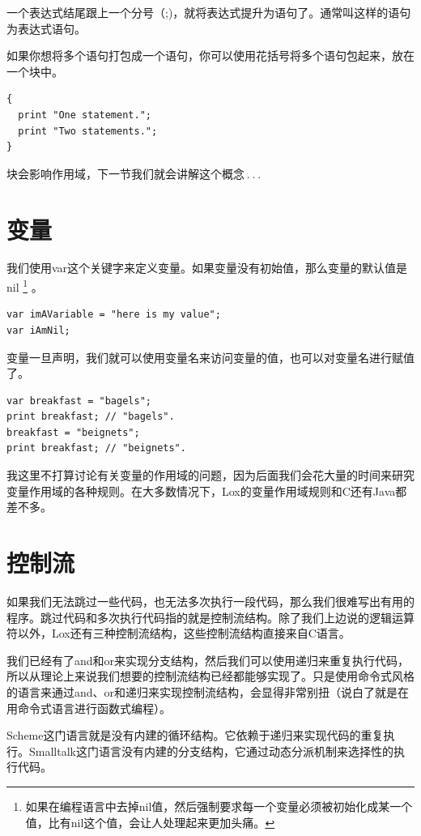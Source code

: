 \documentclass[cn,10pt,math=newtx,citestyle=gb7714-2015,bibstyle=gb7714-2015]{elegantbook}
\begin{document}
一个表达式结尾跟上一个分号（;)，就将表达式提升为语句了。通常叫这样的语句为表达式语句。

如果你想将多个语句打包成一个语句，你可以使用花括号将多个语句包起来，放在一个块中。

\begin{verbatim}
{
  print "One statement.";
  print "Two statements.";
}
\end{verbatim}

块会影响作用域，下一节我们就会讲解这个概念 . . .

\section{变量}

我们使用var这个关键字来定义变量。如果变量没有初始值，那么变量的默认值是nil \footnote{如果在编程语言中去掉nil值，然后强制要求每一个变量必须被初始化成某一个值，比有nil这个值，会让人处理起来更加头痛。} 。

\begin{verbatim}
var imAVariable = "here is my value";
var iAmNil;
\end{verbatim}

变量一旦声明，我们就可以使用变量名来访问变量的值，也可以对变量名进行赋值了。

\begin{verbatim}
var breakfast = "bagels";
print breakfast; // "bagels".
breakfast = "beignets";
print breakfast; // "beignets".
\end{verbatim}

我这里不打算讨论有关变量的作用域的问题，因为后面我们会花大量的时间来研究变量作用域的各种规则。在大多数情况下，Lox的变量作用域规则和C还有Java都差不多。

\section{控制流}

如果我们无法跳过一些代码，也无法多次执行一段代码，那么我们很难写出有用的程序。跳过代码和多次执行代码指的就是控制流结构。除了我们上边说的逻辑运算符以外，Lox还有三种控制流结构，这些控制流结构直接来自C语言。

\begin{tcolorbox}
我们已经有了and和or来实现分支结构，然后我们可以使用递归来重复执行代码，所以从理论上来说我们想要的控制流结构已经都能够实现了。只是使用命令式风格的语言来通过and、or和递归来实现控制流结构，会显得非常别扭（说白了就是在用命令式语言进行函数式编程）。

Scheme这门语言就是没有内建的循环结构。它依赖于递归来实现代码的重复执行。Smalltalk这门语言没有内建的分支结构，它通过动态分派机制来选择性的执行代码。
\end{tcolorbox}
\end{document}
